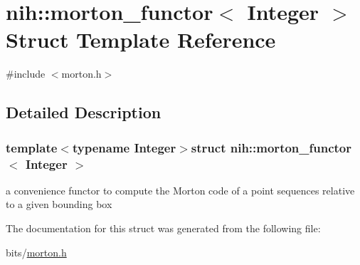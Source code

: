 \hypertarget{structnih_1_1morton__functor}{
\section{nih\-:\-:morton\-\_\-functor$<$ \-Integer $>$ \-Struct \-Template \-Reference}
\label{structnih_1_1morton__functor}
}


{\ttfamily \#include $<$morton.\-h$>$}



\subsection{\-Detailed \-Description}
\subsubsection*{template$<$typename Integer$>$struct nih\-::morton\-\_\-functor$<$ Integer $>$}

a convenience functor to compute the \-Morton code of a point sequences relative to a given bounding box 

\-The documentation for this struct was generated from the following file\-:\begin{DoxyCompactItemize}
\item 
bits/\hyperlink{morton_8h}{morton.\-h}\end{DoxyCompactItemize}
